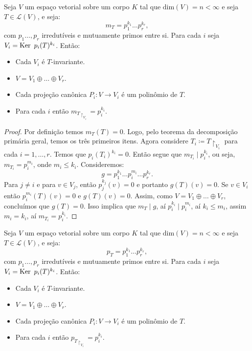 \documentclass[11pt,twoside,a4paper]{book}
\begin{document}
\begin{teorema}\label{primaria minimal}
Seja \(V\) um espaço vetorial sobre um corpo \(K\) tal que
\(\text{dim}(V)=n<\infty\) e seja \(T\in\mathcal{L}(V)\), e seja:
\[
m_T=p_1^{k_1}\ldots p_r^{k_r},
\]
com \(p_1\dots,p_r\) irredutíveis e mutuamente
primos entre si. Para cada $i$ seja $V_i=\operatorname{Ker} \ p_i(T)^{k_i}$. Então:
\begin{itemize}
\item Cada $V_i$ é $T$-invariante.
\item $V=V_1\oplus\dots\oplus V_r$.
\item Cada projeção canônica $P_i:V\rightarrow V_i$ é um polinômio de $T$.
\item Para cada $i$ então \(m_{T\upharpoonright_{V_i}}=p_i^{k_i}\).
\end{itemize}
\end{teorema}
\begin{proof}
Por definição temos \(m_T(T)=0\). Logo, pelo teorema da decomposição primária geral, temos os três primeiros itens. Agora considere \(T_i\coloneqq T\upharpoonright_{V_i}\)
para cada \(i=1,\dots,r\).
Temos que \(p_i(T_i)^{k_i}=0\). Então segue que \(m_{T_i}\mid
p_i^{k_i}\), ou seja,
\(m_{T_i}=p_i^{m_i}\), onde \(m_i\leq k_i\). Consideremos:
\[
g=p_1^{k_1}\ldots p_i^{m_i}\ldots
p_r^{k_r}.
\]
Para $j\neq i$ e para \(v\in V_j\), então \(p_j^{k_j}(v)=0\) e portanto
\(g(T)(v)=0\). Se \(v\in V_i\) então \(p_i^{m_i}(T)(v)=0\) e
\(g(T)(v)=0\). Assim, como $V=V_1\oplus\dots\oplus V_r$, concluímos que \(g(T)=0\).
Isso implica que \(m_T\mid g\), aí \(p_i^{k_i}\mid p_i^{m_i}\), aí $k_i\leq m_i$, assim $m_i=k_i$, aí \(m_{T_i}=p_i^{k_i}.\)
\end{proof}
\begin{teorema}\label{primaria caracteristico}
Seja \(V\) um espaço vetorial sobre um corpo \(K\) tal que
\(\text{dim}(V)=n<\infty\) e seja \(T\in\mathcal{L}(V)\), e seja:
\[
p_T=p_1^{k_1}\ldots p_r^{k_r},
\]
com \(p_1\dots,p_r\) irredutíveis e mutuamente
primos entre si. Para cada $i$ seja $V_i=\operatorname{Ker} \ p_i(T)^{k_i}$. Então:
\begin{itemize}
\item Cada $V_i$ é $T$-invariante.
\item $V=V_1\oplus\dots\oplus V_r$.
\item Cada projeção canônica $P_i:V\rightarrow V_i$ é um polinômio de $T$.
\item Para cada $i$ então \(p_{T\upharpoonright_{V_i}}=p_i^{k_i}\).
\end{itemize}
\end{teorema}
\end{document}
